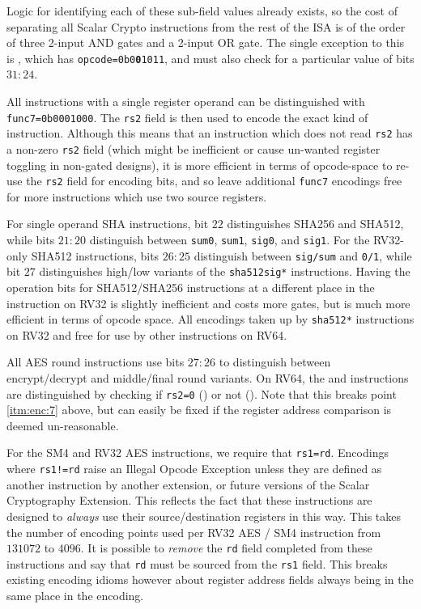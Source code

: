 \noindent
Logic for identifying each of these sub-field values already exists, so
the cost of separating all Scalar Crypto instructions from the rest of the
ISA is of the order of three 2-input AND gates and a 2-input OR gate.
The single exception to this is , which has
{\tt opcode=0b0{\bf 0}1011}, and must also check for a particular
value of bits $31:24$.

All instructions with a single register operand can be distinguished
with {\tt func7=0b0001000}.
The {\tt rs2} field is then used to encode the exact kind of instruction.
Although this means that an instruction which does not read {\tt rs2} has
a non-zero {\tt rs2} field (which might be inefficient or cause un-wanted
register toggling in non-gated designs),
it is more efficient in terms of opcode-space to re-use the {\tt rs2} field
for encoding bits, and
so leave additional {\tt func7} encodings free for more instructions which
use two source registers.

For single operand SHA instructions,
bit $22$ distinguishes SHA256 and SHA512, while
bits $21:20$ distinguish between
{\tt sum0},
{\tt sum1},
{\tt sig0},
and
{\tt sig1}.
For the RV32-only SHA512 instructions,
bits $26:25$ distinguish between {\tt sig/sum} and {\tt 0/1},
while bit $27$ distinguishes high/low variants of the {\tt sha512sig*}
instructions.
Having the operation bits for SHA512/SHA256 instructions at a different place
in the instruction on RV32 is slightly inefficient and costs more gates,
but is much more efficient in terms of opcode space.
All encodings taken up by {\tt sha512*} instructions on RV32 and
free for use by other instructions on RV64.

All AES round instructions use bits $27:26$ to distinguish between
encrypt/decrypt and middle/final round variants.
On RV64, the  and  instructions
are distinguished by checking if
{\tt rs2=0} () or not ().
Note that this breaks point \ref{itm:enc:7} above, but can easily be
fixed if the register address comparison is deemed un-reasonable.

For the SM4 and RV32 AES instructions, we require that {\tt rs1=rd}.
Encodings where {\tt rs1!=rd} raise an Illegal Opcode Exception unless
they are defined as another instruction by another extension, or
future versions of the Scalar Cryptography Extension.
This reflects the fact that these instructions are designed to {\em always}
use their source/destination registers in this way.
This takes the number of encoding points used per RV32 AES / SM4 instruction
from $131072$ to $4096$.
It is possible to {\em remove} the {\tt rd} field completed from these
instructions and say that {\tt rd} must be sourced from the {\tt rs1}
field.
This breaks existing encoding idioms however about register address fields
always being in the same place in the encoding.

